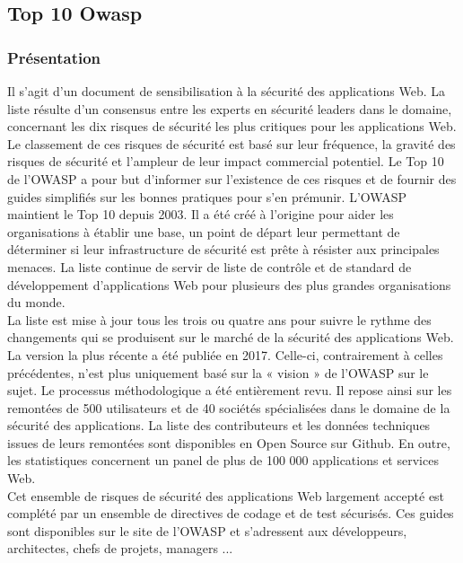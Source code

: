 \subsection{Top 10 Owasp}
\subsubsection{Présentation}
Il s’agit d’un document de sensibilisation à la sécurité des applications Web. La liste résulte d’un consensus entre les experts en sécurité leaders dans le domaine, concernant les dix risques de sécurité les plus critiques pour les applications Web. Le classement de ces risques de sécurité est basé sur leur fréquence, la gravité des risques de sécurité et l'ampleur de leur impact commercial potentiel. Le Top 10 de l’OWASP a pour but d’informer sur l’existence de ces risques et de fournir des guides simplifiés sur les bonnes pratiques pour s’en prémunir. L’OWASP maintient le Top 10 depuis 2003. Il a été créé à l'origine pour aider les organisations à établir une base, un point de départ leur permettant de déterminer si leur infrastructure de sécurité est prête à résister aux principales menaces. La liste continue de servir de liste de contrôle et de standard de développement d'applications Web pour plusieurs des plus grandes organisations du monde. \\
La liste est mise à jour tous les trois ou quatre ans pour suivre le rythme des changements qui se produisent sur le marché de la sécurité des applications Web. La version la plus récente a été publiée en 2017. Celle-ci, contrairement à celles précédentes, n’est plus uniquement basé sur la « vision » de l’OWASP sur le sujet. Le processus méthodologique a été entièrement revu. Il repose ainsi sur les remontées de 500 utilisateurs et de 40 sociétés spécialisées dans le domaine de la sécurité des applications. La liste des contributeurs et les données techniques issues de leurs remontées sont disponibles en Open Source sur Github. En outre, les statistiques concernent un panel de plus de 100 000 applications et services Web.\\
Cet ensemble de risques de sécurité des applications Web largement accepté est complété par un ensemble de directives de codage et de test sécurisés. Ces guides sont disponibles sur le site de l'OWASP et s'adressent aux développeurs, architectes, chefs de projets, managers ...

